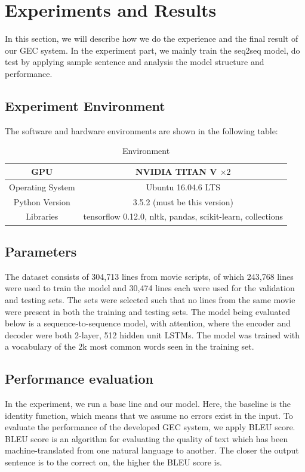 \chapter{Experiments and Results}
\label{chapter6}

In this section, we will describe how we do the experience and the final result of our GEC system. In the experiment part, we mainly train the seq2seq model, do test by applying sample sentence and analysis the model structure and performance.

\section{Experiment Environment}
The software and hardware environments are shown in the following table:
\begin{table}[ht]
\centering
\begin{tabular}{|c | c |} 
    \hline
    GPU & NVIDIA TITAN V $\times2$ \\  
    \hline
    Operating System & Ubuntu 16.04.6 LTS \\ 
    \hline
    Python Version & 3.5.2 (must be this version) \\
    \hline
    Libraries & tensorflow 0.12.0, nltk, pandas, scikit-learn, collections \\ 
    \hline
\end{tabular}
\caption{Environment}
\label{table:1}
\end{table}

\section{Parameters}
The dataset consists of 304,713 lines from movie scripts, of which 243,768 lines were used to train the model and 30,474 lines each were used for the validation and testing sets. The sets were selected such that no lines from the same movie were present in both the training and testing sets.
The model being evaluated below is a sequence-to-sequence model, with attention, where the encoder and decoder were both 2-layer, 512 hidden unit LSTMs. The model was trained with a vocabulary of the 2k most common words seen in the training set.
\section{Performance evaluation}
In the experiment, we run a base line and our model. Here, the baseline is the identity function, which means that we assume no errors exist in the input. To evaluate the performance of the developed GEC system, we apply BLEU score. BLEU score is an algorithm for evaluating the quality of text which has been machine-translated from one natural language to another. The closer the output sentence is to the correct on, the higher the BLEU score is.

